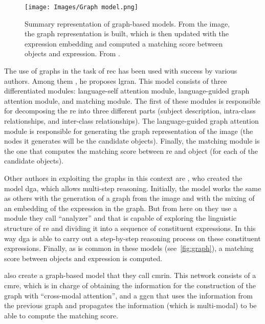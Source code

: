 \begin{figure}[ht]
  \centering
  \texttt{[image: Images/Graph model.png]}
  \caption[Graph based model representation]{Summary representation of
    graph-based models. From the image, the graph representation is built,
    which is then updated with the expression embedding and computed a matching
    score between objects and expression. From
    .}%
  \label{fig:graph}
\end{figure}

The use of graphs in the task of \gls{rec} has been used with success by
various authors. Among them , he proposes
\gls{lgran}. This model consists of three differentiated modules: language-self
attention module, language-guided graph attention module, and matching
module. The first of these modules is responsible for decomposing the \gls{re}
into three different parts (subject description, intra-class relationships, and
inter-class relationships). The language-guided graph attention module is
responsible for generating the graph representation of the image (the nodes it
generates will be the candidate objects). Finally, the matching module is the
one that computes the matching score between \gls{re} and object (for each of
the candidate objects).

Other authors in exploiting the graphs in this context are
, who created the model \gls{dga}, which allows multi-step
reasoning. Initially, the model works the same as others with the generation of
a graph from the image and with the mixing of an embedding of the expression in
the graph. But from here on they use a module they call ``analyzer'' and that
is capable of exploring the linguistic structure of \gls{re} and dividing it
into a sequence of constituent expressions. In this way \gls{dga} is able to
carry out a step-by-step reasoning process on these constituent
expressions. Finally, as is common in these models (see\ \vref{fig:graph}), a
matching score between objects and expression is computed.

 also create a
graph-based model that they call \gls{cmrin}. This network consists of a
\gls{cmre}, which is in charge of obtaining the information for the
construction of the graph with ``cross-modal attention'', and a \gls{ggcn} that
uses the information from the previous graph and propagates the information
(which is multi-modal) to be able to compute the matching score.
